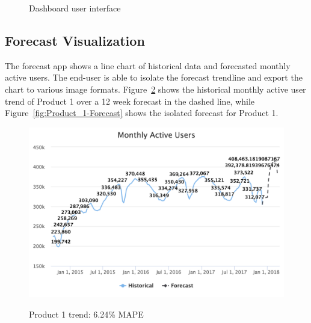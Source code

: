 \documentclass[11pt, oneside]{article}
\begin{document}
\begin{figure}[h]
  \caption{Dashboard user interface}
  \centering
  \label{fig:Dashboard}
\end{figure}

\subsection{Forecast Visualization}
The forecast app shows a line chart of historical data and forecasted monthly active users. The end-user is able to isolate the forecast trendline and export the chart to various image formats. Figure~\ref{fig:Product_1-Trend} shows the historical monthly active user trend of Product 1 over a 12 week forecast in the dashed line, while Figure~\ref{fig:Product_1-Forecast} shows the isolated forecast for Product 1.

\begin{figure}[h]
  \caption{Product 1 trend: 6.24\% MAPE}
  \centering
  \includegraphics[width=12.5cm]{images/Product_1-Trend-6_24_Percent_MAPE.png}
  \label{fig:Product_1-Trend}
\end{figure}
\end{document}
